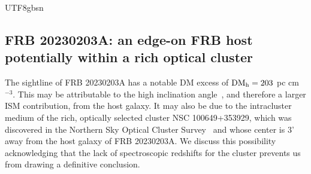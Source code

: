 \documentclass[twocolumn,linenumbers]{aastex631}
\newcommand{\msbold}[1]{\textbf{#1}}
\newcommand{\dmh}{\ensuremath{{\rm DM}_\textrm{h}}}
\begin{document}
\begin{CJK*}{UTF8}{gbsn}


\subsection{FRB 20230203A: an edge-on FRB \msbold{host} potentially within a rich optical cluster}\label{sec:FRB20230203A}
The sightline of FRB 20230203A has a notable DM excess of $\dmh = 203$ pc cm$^{-3}$. This may be attributable to the high inclination angle~\citep[$i\approx 80^\circ$;][]{kourkchi2020cosmicflows}, and therefore a larger ISM contribution, from the host galaxy. It may also be due to the intracluster medium of the rich, optically selected cluster NSC 100649+353929, which was discovered in the Northern Sky Optical Cluster Survey~\citep{2000AJ....119...12G,gal2003northern} and whose center is 3' away from the host galaxy of FRB 20230203A. We discuss this possibility acknowledging that the lack of spectroscopic redshifts for the cluster prevents us from drawing a definitive conclusion. 


\end{CJK*}
\end{document}
